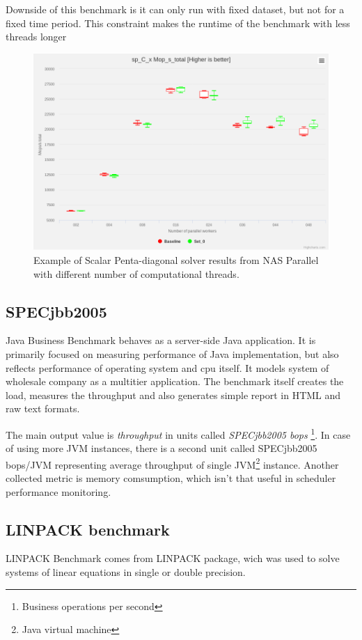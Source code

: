 Downside of this benchmark is it can only run with fixed dataset, but not for a
fixed time period. This constraint makes the runtime of the benchmark with less threads longer

\begin{figure}
  \centering
  \includegraphics[width=12cm]{obrazky-figures/nas}
  \caption{Example of Scalar Penta-diagonal solver results from NAS Parallel with
    different number of computational threads.}
  \label{fig:nas}
\end{figure}

\subsection{SPECjbb2005}
Java Business Benchmark behaves as a server-side Java application. It is primarily focused on measuring performance of Java implementation, but also reflects performance of operating system and cpu itself.
It models system of wholesale company as a multitier application. The benchmark
itself creates the load, measures the throughput and also generates simple
report in HTML and raw text formats.

The main output value is \emph{throughput} in units called \emph{SPECjbb2005
  bops} \footnote{Business operations per second}.
In case of using more JVM instances, there is a second unit called SPECjbb2005
bops/JVM representing average throughput of single JVM\footnote{Java virtual machine} instance.
Another collected metric is memory comsumption, which isn't that useful in
scheduler performance monitoring.

\subsection{LINPACK benchmark}
LINPACK Benchmark comes from LINPACK package, wich was used to solve systems of linear equations in single or double precision.

